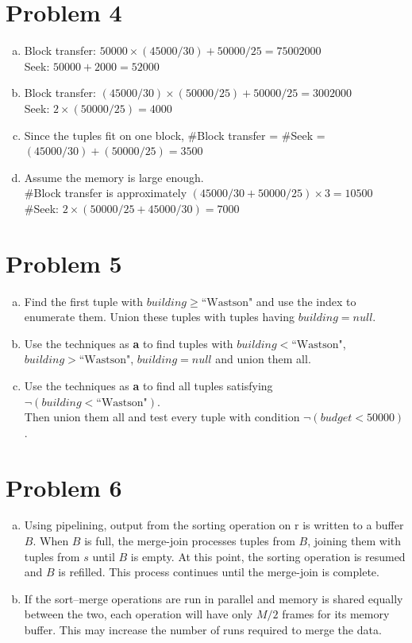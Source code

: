 \documentclass[a4paper,11pt]{article}
\begin{document}
\section*{Problem 4}
\begin{enumerate}[a.]
\item
Block transfer: $50000\times(45000/30) + 50000/25 = 75002000$\\
Seek: $50000 + 2000=52000$
\item 
Block transfer: $(45000/30)\times(50000/25) + 50000/25 = 3002000$\\
Seek: $2\times(50000/25)=4000$
\item
Since the tuples fit on one block, $\#$Block transfer = $\#$Seek = $(45000/30)+(50000/25)=3500$
\item
Assume the memory is large enough.\\
$\#$Block transfer is approximately $(45000/30+50000/25)\times 3=10500$\\
$\#$Seek: $2\times(50000/25+45000/30)=7000$
\end{enumerate}
\section*{Problem 5}
\begin{enumerate}[a.]
\item
Find the first tuple with $building \geq \text{``Wastson"}$ and use the index to enumerate them.
Union these tuples with tuples having $building = null$.
\item 
Use the techniques as \textbf{a} to find tuples with $building < \text{``Wastson"}$, $building > \text{``Wastson"}$, $building = null$ and union them all.
\item 
Use the techniques as \textbf{a} to find all tuples satisfying $\neg(building < \text{``Wastson"})$.\\
Then union them all and test every tuple with condition $\neg(budget < 50000)$.
\end{enumerate}

\section*{Problem 6}
\begin{enumerate}[a.]
\item
Using pipelining, output from the sorting operation on r is written to a 
buffer $B$. When $B$ is full, the merge-join processes tuples from $B$, 
joining them with tuples from $s$ until $B$ is empty. At this point, the 
sorting operation is resumed and $B$ is refilled. This process continues 
until the merge-join is complete.
\item 
If the sort–merge operations are run in parallel and memory is shared 
equally between the two, each operation will have only $M/2$ frames for 
its memory buffer. This may increase the number of runs required to 
merge the data. 
\end{enumerate}
\end{document}
